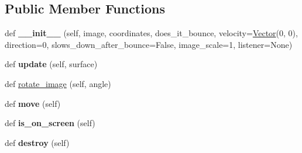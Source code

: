 \subsection*{Public Member Functions}
\begin{DoxyCompactItemize}
\item 
def {\bfseries \+\_\+\+\_\+init\+\_\+\+\_\+} (self, image, coordinates, does\+\_\+it\+\_\+bounce, velocity=\hyperlink{classVector_1_1Vector}{Vector}(0, 0), direction=0, slows\+\_\+down\+\_\+after\+\_\+bounce=False, image\+\_\+scale=1, listener=None)\hypertarget{classMovingObject_1_1MovingObject_a237013581377a7e5f7163d47254dbce8}{}\label{classMovingObject_1_1MovingObject_a237013581377a7e5f7163d47254dbce8}

\item 
def {\bfseries update} (self, surface)\hypertarget{classMovingObject_1_1MovingObject_ab8d51c9a7e120afad47200b6166d2530}{}\label{classMovingObject_1_1MovingObject_ab8d51c9a7e120afad47200b6166d2530}

\item 
def \hyperlink{classMovingObject_1_1MovingObject_ac2299da57e4ff40983ed385c33ac4c63}{rotate\+\_\+image} (self, angle)
\item 
def {\bfseries move} (self)\hypertarget{classMovingObject_1_1MovingObject_a6060cd55441bc6f9473c4ad5520adc8c}{}\label{classMovingObject_1_1MovingObject_a6060cd55441bc6f9473c4ad5520adc8c}

\item 
def {\bfseries is\+\_\+on\+\_\+screen} (self)\hypertarget{classMovingObject_1_1MovingObject_a3c44ea1a39ee9bd15bb16295a7f6bf75}{}\label{classMovingObject_1_1MovingObject_a3c44ea1a39ee9bd15bb16295a7f6bf75}

\item 
def {\bfseries destroy} (self)\hypertarget{classMovingObject_1_1MovingObject_a7deae65ed90400dab791e8611e86c833}{}\label{classMovingObject_1_1MovingObject_a7deae65ed90400dab791e8611e86c833}

\end{DoxyCompactItemize}
